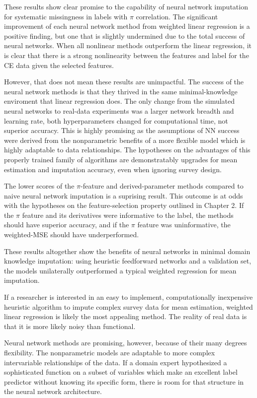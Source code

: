\documentclass[12pt,twoside]{reedthesis}
\begin{document}
These results show clear promise to the capability of neural network
imputation for systematic missingness in labels with \(\pi\)
correlation. The significant improvement of each neural network method
from weighted linear regression is a positive finding, but one that is
slightly undermined due to the total success of neural networks. When
all nonlinear methods outperform the linear regression, it is clear that
there is a strong nonlinearity between the features and label for the CE
data given the selected features.

However, that does not mean these results are unimpactful. The success
of the neural network methods is that they thrived in the same
minimal-knowledge enviroment that linear regression does. The only
change from the simulated neural networks to real-data experiments was a
larger network breadth and learning rate, both hyperparameters changed
for computational time, not superior accuracy. This is highly promising
as the assumptions of NN success were derived from the nonparametric
benefits of a more flexible model which is highly adaptable to data
relationships. The hypotheses on the advantages of this properly trained
family of algorithms are demonstratably upgrades for mean estimation and
imputation accuracy, even when ignoring survey design.

The lower scores of the \(\pi\)-feature and derived-parameter methods
compared to naive neural network imputation is a suprising result. This
outcome is at odds with the hypotheses on the feature-selection property
outlined in Chapter 2. If the \(\pi\) feature and its derivatives were
informative to the label, the methods should have superior accuracy, and
if the \(\pi\) feature was uninformative, the weighted-MSE should have
underperformed.

These results altogether show the benefits of neural networks in minimal
domain knowledge imputation: using heuristic feedforward networks and a
validation set, the models unilaterally outperformed a typical weighted
regression for mean imputation.

If a researcher is interested in an easy to implement, computationally
inexpensive heuristic algorithm to impute complex survey data for mean
estimation, weighted linear regression is likely the most appealing
method. The reality of real data is that it is more likely noisy than
functional.

Neural network methods are promising, however, because of their many
degrees flexibility. The nonparametric models are adaptable to more
complex intervariable relationships of the data. If a domain expert
hypothesized a sophisticated function on a subset of variables which
make an excellent label predictor without knowing its specific form,
there is room for that structure in the neural network architecture.
\end{document}
